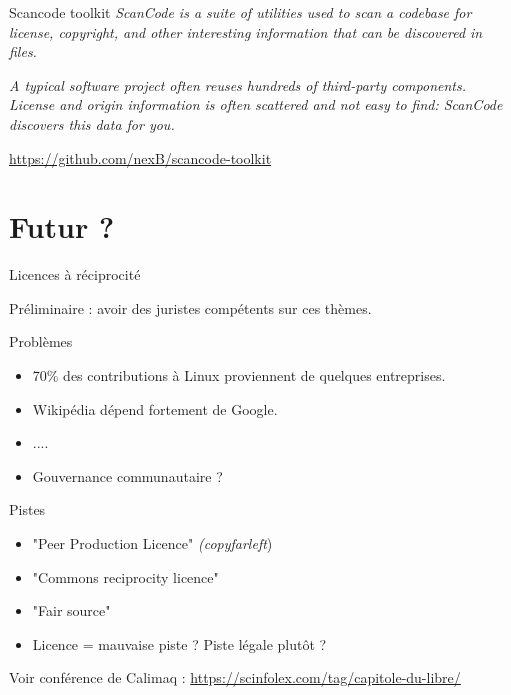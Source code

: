\documentclass{beamer}
\begin{document}

\begin{frame}{Scancode toolkit}
\textit{ ScanCode is a suite of utilities used to scan a codebase for license, copyright, and other interesting information that can be discovered in files.}

\textit{A typical software project often reuses hundreds of third-party components. License and origin information is often scattered and not easy to find: ScanCode discovers this data for you.}

\url{https://github.com/nexB/scancode-toolkit}
\end{frame}

\begin{frame}[plain]%
%  
\end{frame}



\section{Futur ?}

\begin{frame}{Licences à réciprocité}

Préliminaire : avoir des juristes compétents sur ces thèmes.

  \begin{block}{Problèmes}
    \begin{itemize}
    \item 70\% des contributions à Linux proviennent de quelques entreprises. 
    \item Wikipédia dépend fortement de Google.
    \item ....
    \item Gouvernance communautaire ? 
    \end{itemize}
  \end{block}

  \begin{block}{Pistes}
    \begin{itemize}
    \item "Peer Production Licence" \textit{(copyfarleft})
    \item "Commons reciprocity licence"
    \item "Fair source"
    \item Licence = mauvaise piste ? Piste légale plutôt ?
    \end{itemize}
  
  \end{block}
  
Voir conférence de Calimaq : \url{https://scinfolex.com/tag/capitole-du-libre/}
  
\end{frame}
\end{document}
